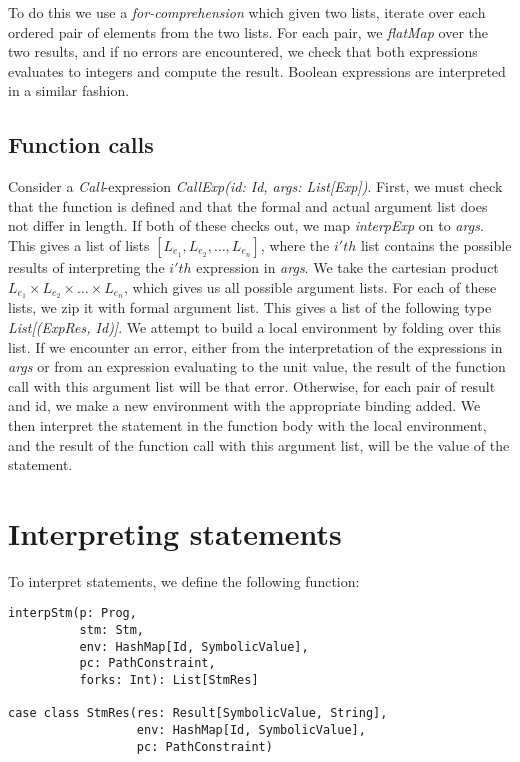 To do this we use a \textsl{for-comprehension} which given two lists, iterate over each ordered pair of elements from the two lists.  For each pair, we \textsl{flatMap} over the two results, and if no errors are encountered, we check that both expressions evaluates to integers and compute the result.
Boolean expressions are interpreted in a similar fashion.

\subsection{Function calls}
Consider a \textsl{Call}-expression \textsl{CallExp(id: Id, args: List[Exp])}.
First, we must check that the function is defined and that the formal and actual argument list does not differ in length. If both of these checks out, we map \textsl{interpExp} on to \textsl{args}. This gives a list of lists $[L_{e_1}, L_{e_2}, \ldots, L_{e_n}]$, where the $i'th$ list contains the possible results of interpreting the $i'th$ expression in \textsl{args}.
We take the cartesian product $L_{e_1} \times L_{e_2} \times \ldots \times L_{e_n}$, which gives us all possible argument lists. For each of these lists, we zip it with formal argument list. This gives a list of the following type \textsl{List[(ExpRes, Id)]}. We attempt to build a local environment by folding over this list. If we encounter an error, either from the interpretation of the expressions in \textsl{args} or from an expression evaluating to the unit value, the result of the function call with this argument list will be that error. Otherwise, for each pair of result and id, we make a new environment with the appropriate binding added. We then interpret the statement in the function body  with the local environment, and the result of the function call with this argument list, will be the value of the statement.

\section{Interpreting statements}

To interpret statements, we define the following function:

\begin{lstlisting}[style=simple]
interpStm(p: Prog, 
		  stm: Stm, 
		  env: HashMap[Id, SymbolicValue], 
		  pc: PathConstraint,
		  forks: Int): List[StmRes]
			  
case class StmRes(res: Result[SymbolicValue, String], 
				  env: HashMap[Id, SymbolicValue], 
				  pc: PathConstraint)
\end{lstlisting}

